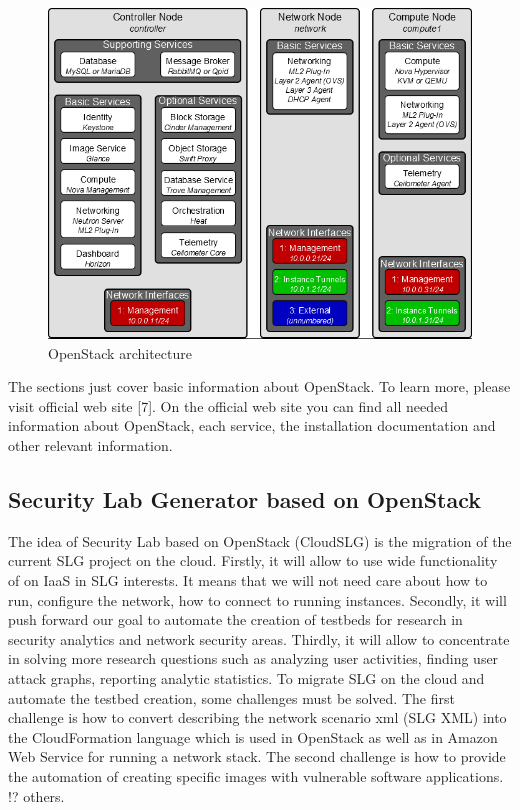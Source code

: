 \begin{figure}[ht!]
\centering
\includegraphics[width=\textwidth]{openstack_architecture.png}
\caption{OpenStack architecture}
\label{overflow}
\end{figure}

The sections just cover basic information about OpenStack. To learn more, please visit official web site [7]. On the official web site you can find all needed information about OpenStack, each service, the installation documentation and other relevant information. 


\subsection{Security Lab Generator based on OpenStack}
The idea of Security Lab based on OpenStack (CloudSLG) is the migration of the current SLG project on the cloud. Firstly, it will allow to use wide functionality of on IaaS in SLG interests. It means that we will not need care about how to run, configure the network, how to connect to running instances. Secondly, it will push forward our goal to automate the creation of testbeds for research in security analytics and network security areas. Thirdly, it will allow to concentrate in solving more research questions such as analyzing user activities, finding user attack graphs, reporting analytic statistics. To migrate SLG on the cloud and automate the testbed creation, some challenges must be solved. The first challenge is how to convert describing the network scenario xml (SLG XML) into the CloudFormation language which is used in OpenStack as well as in Amazon Web Service for running a network stack. The second challenge is how to provide the automation of creating specific images with vulnerable software applications. !? others.  



% 